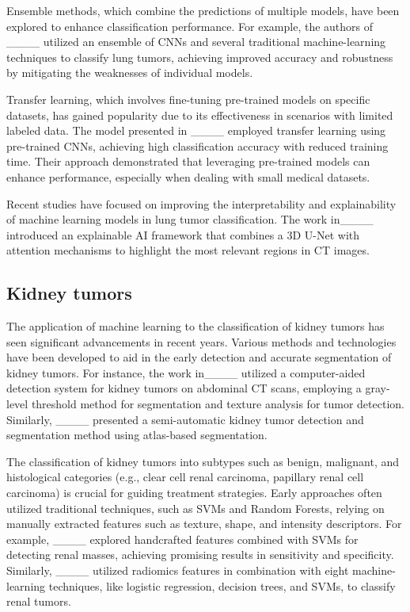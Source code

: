 Ensemble methods, which combine the predictions of multiple models, have been explored to enhance classification performance. For example, the authors of ____ utilized an ensemble of CNNs and several traditional machine-learning techniques to classify lung tumors, achieving improved accuracy and robustness by mitigating the weaknesses of individual models.

Transfer learning, which involves fine-tuning pre-trained models on specific datasets, has gained popularity due to its effectiveness in scenarios with limited labeled data. The model presented in ____ employed transfer learning using pre-trained CNNs, achieving high classification accuracy with reduced training time. Their approach demonstrated that leveraging pre-trained models can enhance performance, especially when dealing with small medical datasets.

Recent studies have focused on improving the interpretability and explainability of machine learning models in lung tumor classification. The work in____ introduced an explainable AI framework that combines a 3D U-Net with attention mechanisms to highlight the most relevant regions in CT images.


\subsection{Kidney tumors}

The application of machine learning to the classification of kidney tumors has seen significant advancements in recent years. Various methods and technologies have been developed to aid in the early detection and accurate segmentation of kidney tumors. For instance, the work in____ utilized a computer-aided detection system for kidney tumors on abdominal CT scans, employing a gray-level threshold method for segmentation and texture analysis for tumor detection. Similarly, ____ presented a semi-automatic kidney tumor detection and segmentation method using atlas-based segmentation.

The classification of kidney tumors into subtypes such as benign, malignant, and histological categories (e.g., clear cell renal carcinoma, papillary renal cell carcinoma) is crucial for guiding treatment strategies. Early approaches often utilized traditional techniques, such as SVMs and Random Forests, relying on manually extracted features such as texture, shape, and intensity descriptors. For example, ____ explored handcrafted features combined with SVMs for detecting renal masses, achieving promising results in sensitivity and specificity. Similarly, ____ utilized radiomics features in combination with eight machine-learning techniques, like logistic regression, decision trees, and SVMs, to classify renal tumors.

